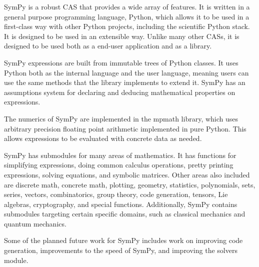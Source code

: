 SymPy is a robust CAS that provides a wide array of features. It is written in
a general purpose programming language, Python, which allows it to be used in
a first-class way with other Python projects, including the scientific Python
stack. It is designed to be used in an extensible way. Unlike many other CASs,
it is designed to be used both as a end-user application and as a library.

SymPy expressions are built from immutable trees of Python classes. It uses
Python both as the internal language and the user language, meaning users can
use the same methods that the library implements to extend it. SymPy has an
assumptions system for declaring and deducing mathematical properties on
expressions.

The numerics of SymPy are implemented in the mpmath library, which uses
arbitrary precision floating point arithmetic implemented in pure Python. This
allows expressions to be evaluated with concrete data as needed.

SymPy has submodules for many areas of mathematics. It has functions for
simplifying expressions, doing common calculus operations, pretty printing
expressions, solving equations, and symbolic matrices. Other areas also
included are discrete math, concrete math, plotting, geometry, statistics,
polynomials, sets, series, vectors, combinatorics, group theory, code
generation, tensors, Lie algebras, cryptography, and special functions.
Additionally, SymPy contains submodules targeting certain specific domains,
such as classical mechanics and quantum mechanics.


Some of the planned future work for SymPy includes work on improving code
generation, improvements to the speed of SymPy, and improving the solvers
module.

